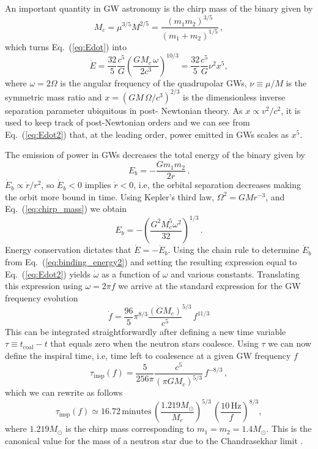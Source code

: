 \documentclass[prd,amsmath,amssymb,aps,floats,amsfonts,notitlepage,superscriptaddress,eqsecnum,nofootinbib,10pt]{revtex4-1}
\newcommand{\f}{\frac}
\newcommand{\be}{\begin{equation}}
\newcommand{\ee}{\end{equation}}
\begin{document}
An important quantity in GW astronomy is the chirp mass of the binary given by
%
\be
M_c = \mu^{3/5} M^{2/5} = \f{(m_1 m_2)^{3/5}}{(m_1+m_2)^{1/5}} \label{eq:chirp_mass}\, ,
\ee
%
which turns Eq.~(\ref{eq:Edot}) into
%
\be
\dot{E} = \f{32}{5}\f{c^5}{G} \left(\f{G M_c\, \omega}{2c^3}\right)^{10/3}= \f{32}{5}\f{c^5}{G} \nu^2 x^5, \label{eq:Edot2}
\ee
%
where $\omega=2\Omega$ is the angular frequency of the quadrupolar GWs, $\nu\equiv \mu/M$ is the symmetric mass ratio and $x = ({G M\, \Omega}/{c^3})^{2/3} $ is the dimensionless inverse separation parameter ubiquitous 
in post- Newtonian theory. 
As $x\propto v^2/c^2$, it is used to keep track of post-Newtonian orders and we can see from Eq.~(\ref{eq:Edot2})
that, at the leading order, power emitted in GWs scales as $x^5$.

The emission of power in GWs decreases the total energy of the binary given by
%
\be
E_b = -\frac{G m_1 m_2}{2r}\,.  \label{eq:binding_energy1}
\ee
%
$\dot{E}_b \propto \dot{r}/r^2$, so $\dot{E}_b < 0$ implies $\dot{r}<0$, i.e, the orbital separation decreases
making the orbit more bound in time.
Using Kepler's third law, $ \Omega^2 = G M r^{-3}$, and Eq.~(\ref{eq:chirp_mass}) we obtain
%
\be
E_b = -\left(\f{G^2 M_c^5 \omega^2}{32}\right)^{1/3}\, . \label{eq:binding_energy2}
\ee
%
Energy conservation dictates that $\dot{E}=-\dot{E}_b$. Using the chain rule to determine $\dot{E}_b$ from Eq.~(\ref{eq:binding_energy2})
and setting the resulting expression equal to Eq.~(\ref{eq:Edot2}) yields $\dot{\omega}$ as a function of $\omega$ and various constants.
Translating this expression using $\omega=2\pi f$ we arrive at the standard expression for the GW frequency evolution
%
\be
\dot{f} = \f{96}{5}\pi^{8/3} \f{(G M_c)}{c^5}^{5/3}\, f^{11/3} \label{eq:fdot}
\ee
%
This can be integrated straightforwardly after defining a new time variable $\tau\equiv t_\text{coal}-t$ that equals zero when the neutron stars coalesce.
Using $\tau$ we can now define the inspiral time, i.e, time left to coalesence at a given GW frequency $f$
%
\be
\tau_\text{insp}(f) = \f{5}{256\pi}\f{c^5}{(\pi G M_c)^{5/3}} \,f^{-8/3}\label{eq:tau_insp}\, ,
\ee
%
%
%
which we can rewrite as follows
%
\be
\tau_\text{insp}(f) \simeq 16.72\,\text{minutes} \, \left(\f{1.219 M_\odot}{M_c}\right)^{5/3}\,\left(\f{10\,\text{Hz}}{f}\right)^{8/3}, \label{eq:tau_insp2}
\ee
%
where $1.219 M_\odot$ is the chirp mass corresponding to $m_1=m_2=1.4 M_\odot$. This is the canonical value for the 
mass of a neutron star due to the Chandrasekhar limit \cite{Chandra}.
\end{document}
